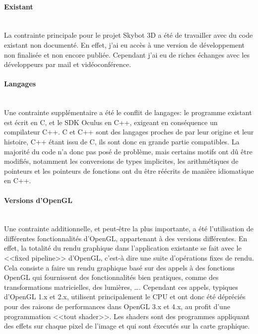 \documentclass[a4paper,french,12pt]{article}
\begin{document}
	    \paragraph{Existant} ~\\
	    
		La contrainte principale pour le projet Skybot 3D a été de travailler avec du code existant non documenté.
		En effet, j'ai eu accès à une version de développement non finalisée et non encore publiée. Cependant j'ai 
		eu de riches échanges avec les développeurs par mail et vidéoconférence.
		
	    \paragraph{Langages} ~\\
	      
		Une contrainte supplémentaire a été le conflit de langages: le programme existant est écrit en C, et le
		SDK Oculus en C++, exigeant en conséquence un compilateur C++. 
		C et C++ sont des langages proches de par leur origine et leur histoire, C++ étant issu de C, 
		ils sont donc en grande partie compatibles. La majorité du code n'a donc pas posé de problème, 
		mais certains motifs ont dû être modifiés, notamment les conversions de types implicites,
		les arithmétiques de pointeurs et les pointeurs de fonctions ont du être réécrits de manière
		idiomatique en C++.
		
	    \paragraph{Versions d'OpenGL} ~\\
	    
		Une contrainte additionnelle, et peut-être la plus importante, a été l'utilisation de différentes 
		fonctionnalités d'OpenGL, appartenant à des versions différentes.
		En effet, la totalité du rendu graphique dans l'application existante se fait avec le <<fixed pipeline>> 
		d'OpenGL, c'est-à dire une suite d'opérations fixes de rendu. Cela consiste a faire un rendu graphique basé sur des
		appels à des fonctions OpenGL qui fournissent des fonctionnalités bien pratiques, comme des transformations
		matricielles, des lumières, \ldots. Cependant ces appels, typiques d'OpenGL 1.x et 2.x, 
		utilisent principalement le CPU et ont donc
		été dépréciés pour des raisons de performances dans OpenGL 3.x et 4.x, au profit d'une programmation
		<<tout shader>>. Les shaders sont des programmes appliquant des effets sur chaque pixel de l'image et qui
		sont éxecutés sur la carte graphique.
		
\end{document}
